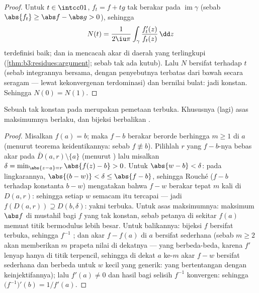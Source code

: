 \begin{proof}
Untuk $t \in \intcc01$, $f_t = f + tg$ tak berakar pada
$\operatorname{im}\gamma$ (sebab $\abs{f_t} \geq \abs f - \abs g >
0$), sehingga
\[
N(t) = \frac1{2\iu\pi}\int_\gamma
\frac{f_t'(z)}{f_t(z)}\,\dd z
\]
terdefinisi baik; dan ia mencacah akar di daerah yang terlingkupi
(\cref{thm:b3:residues:argument}; sebab tak ada kutub). Lalu $N$ bersifat
 terhadap $t$ (sebab integrannya  bersama, dengan
penyebutnya terbatas dari bawah secara seragam --- lewat kekonvergenan
terdominasi) dan bernilai bulat: jadi konstan. Sehingga $N(0) = N(1)$.
\end{proof}

\begin{corollary}
\label{cor:b3:residues:openmapping}
Sebuah  tak konstan pada   merupakan
pemetaan terbuka. Khususnya (lagi) asas maksimumnya
berlaku, dan bijeksi  berbalikan
.
\end{corollary}

\begin{proof}
Misalkan $f(a) = b$; maka $f - b$ berakar berorde berhingga $m
\geq 1$ di $a$ (menurut teorema keidentikannya: sebab $f \not\equiv b$). Pilihlah
$r$ yang $f - b$-nya bebas akar pada $\bar D(a, r)\setminus\{a\}$
(menurut ) lalu misalkan $\delta = \min_{\abs{z - a} =
r}\abs{f(z) - b} > 0$. Untuk $\abs{w - b} < \delta$: pada
lingkarannya, $\abs{(b - w)} < \delta \leq \abs{f - b}$, sehingga
Rouché ($f - b$ terhadap konstanta $b - w$) mengatakan bahwa $f - w$ berakar
tepat $m$ kali di $D(a, r)$: sehingga setiap $w$ semacam itu tercapai
--- jadi $f(D(a,r)) \supseteq D(b, \delta)$: yakni terbuka. Untuk asas
maksimumnya: maksimum $\abs f$ di  mustahil bagi
$f$ yang tak konstan, sebab petanya di sekitar $f(a)$ memuat titik
bermodulus lebih besar. Untuk balikannya: bijeksi  $f$ bersifat
terbuka, sehingga $f^{-1}$ ; dan akar $f - f(a)$ di
$a$ bersifat sederhana (sebab $m \geq 2$ akan memberikan $m$ prapeta nilai
di dekatnya --- yang berbeda-beda, karena $f'$ lenyap hanya di
titik terpencil, sehingga di dekat $a$ ke-$m$ akar $f - w$ bersifat
sederhana dan berbeda untuk $w$ kecil yang generik: yang bertentangan
dengan keinjektifannya); lalu $f'(a) \neq 0$ dan hasil bagi
selisih $f^{-1}$ konvergen: sehingga $\bigl(f^{-1}\bigr)'(b) =
1/f'(a)$.
\end{proof}

